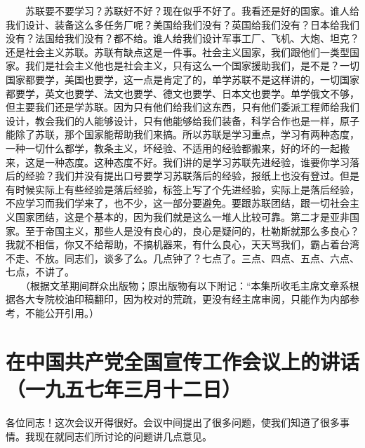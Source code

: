 \documentclass[cn,11pt,chinese]{elegantbook}
\def\myformat#1{\hfil\hfil #1}
\begin{document}
　　苏联要不要学习？苏联好不好？现在似乎不好了。我看还是好的国家。谁人给我们设计、装备这么多任务厂呢？美国给我们没有？英国给我们没有？日本给我们没有？法国给我们没有？都不给。谁人给我们设计军事工厂、飞机、大炮、坦克？还是社会主义苏联。苏联有缺点这是一件事。社会主义国家，我们跟他们一类型国家。我们是社会主义他也是社会主义，只有这么一个国家援助我们，是不是？一切国家都要学，美国也要学，这一点是肯定了的，单学苏联不是这样讲的，一切国家都要学，英文也要学、法文也要学、德文也要学、日本文也要学。单学俄文不够，但主要我们还是学苏联。因为只有他们给我们这东西，只有他们委派工程师给我们设计，教会我们的人能够设计，只有他能够给我们装备，科学合作也是一样，原子能除了苏联，那个国家能帮助我们来搞。所以苏联是学习重点，学习有两种态度，一种一切什么都学，教条主义，坏经验、不适用的经验都搬来，好的坏的一起搬来，这是一种态度。这种态度不好。我们讲的是学习苏联先进经验，谁要你学习落后的经验？我们并没有提出口号要学习苏联落后的经验，报纸上也没有登过。但是有时候实际上有些经验是落后经验，标签上写了个先进经验，实际上是落后经验，不应学习而我们学来了，也不少，这一部分要避免。要跟苏联团结，跟一切社会主义国家团结，这是个基本的，因为我们就是这么一堆人比较可靠。第二才是亚非国家。至于帝国主义，那些人是没有良心的，良心是疑问的，杜勒斯就那么多良心？我就不相信，你又不给帮助，不搞机器来，有什么良心，天天骂我们，霸占着台湾不走、不放。同志们，谈多了么。几点钟了？七点了。三点、四点、五点、六点、七点，不讲了。\\
　　（根据文革期间群众出版物；原出版物有以下附记：“本集所收毛主席文章系根据各大专院校油印稿翻印，因为校对的荒疏，更没有经主席审阅，只能作为内部参考，不能公开引用。）\\
\newpage\section*{\myformat{在中国共产党全国宣传工作会议上的讲话}\\\myformat{（一九五七年三月十二日）}}
各位同志！这次会议开得很好。会议中间提出了很多问题，使我们知道了很多事情。我现在就同志们所讨论的问题讲几点意见。\\
\end{document}
